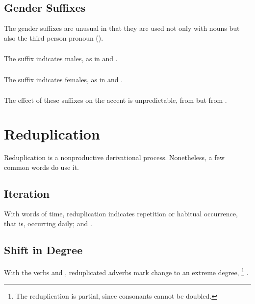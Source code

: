 \subsection{Gender Suffixes} The gender suffixes are unusual in that
they are used not only with nouns but also the third person pronoun
().  \label{lingop:suffix:gender}

\subsubsection{} The suffix  indicates males, as in
  and  .

\subsubsection{} The suffix  indicates females, as in
  and  .

\subsubsection{} The effect of these suffixes on the accent is
unpredictable,   from 
 but   from
 .


\section{Reduplication}
\noindent Reduplication is a nonproductive derivational process.
Nonetheless, a few common words do use it. 

\subsection{Iteration} With words of time, reduplication indicates
repetition or habitual occurrence,   that is,
occurring daily; and  .

\subsection{Shift in Degree} With the verbs   and
 , reduplicated adverbs mark change to an extreme
degree,  
\footnote{The reduplication is partial, since consonants
cannot be doubled.} .\\

